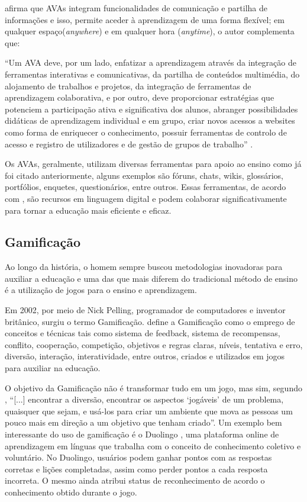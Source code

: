  afirma que AVAs integram funcionalidades de comunicação e partilha de informações e isso, permite aceder à aprendizagem de uma forma flexível; em qualquer espaço(\textit{anywhere}) e em qualquer hora (\textit{anytime}), o autor complementa que:

\begin{citacao}
``Um AVA deve, por um lado, enfatizar a aprendizagem através da integração de ferramentas interativas e comunicativas, da partilha de conteúdos multimédia, do alojamento de trabalhos e projetos, da integração de ferramentas de aprendizagem colaborativa, e por outro, deve proporcionar estratégias que potenciem a participação ativa e significativa dos alunos, abranger possibilidades didáticas de aprendizagem individual e em grupo, criar novos acessos a websites como forma de enriquecer o conhecimento, possuir ferramentas de controlo de acesso e registro de utilizadores e de gestão de grupos de trabalho'' \cite{carvalho2013ambiente}. 
\end{citacao}

Os AVAs, geralmente, utilizam diversas ferramentas para apoio ao ensino como já foi citado anteriormente, alguns exemplos são fóruns, chats, wikis, glossários, portfólios, enquetes, questionários, entre outros. Essas ferramentas, de acordo com , são recursos em linguagem digital e podem colaborar significativamente para tornar a educação mais eficiente e eficaz.


\subsection{Gamificação}

Ao longo da história, o homem sempre buscou metodologias inovadoras para auxiliar a educação e  uma das que mais diferem do tradicional método de ensino é a utilização de jogos para o ensino e aprendizagem. 

Em 2002, por meio de Nick Pelling, programador de computadores e inventor britânico, surgiu o termo Gamificação.  define a Gamificação como o emprego de conceitos e técnicas tais como sistema de feedback, sistema de recompensas, conflito, cooperação, competição, objetivos e regras claras, níveis, tentativa e erro, diversão, interação, interatividade, entre outros, criados e utilizados em jogos para auxiliar na educação. 

O objetivo da Gamificação não é transformar tudo em um jogo, mas sim, segundo , ``[...] encontrar a diversão, encontrar os aspectos `jogáveis' de um problema, quaisquer que sejam, e usá-los para criar um ambiente que mova as pessoas um pouco mais em direção a um objetivo que tenham criado''. Um exemplo bem interessante do uso de gamificação é o Duolingo \cite{von2013duolingo}, uma plataforma online de aprendizagem em línguas que trabalha com o conceito de conhecimento coletivo e voluntário. No Duolingo, usuários podem ganhar pontos com as respostas corretas e lições completadas, assim como perder pontos a cada resposta incorreta. O mesmo ainda atribui status de reconhecimento de acordo o conhecimento obtido durante o jogo.

